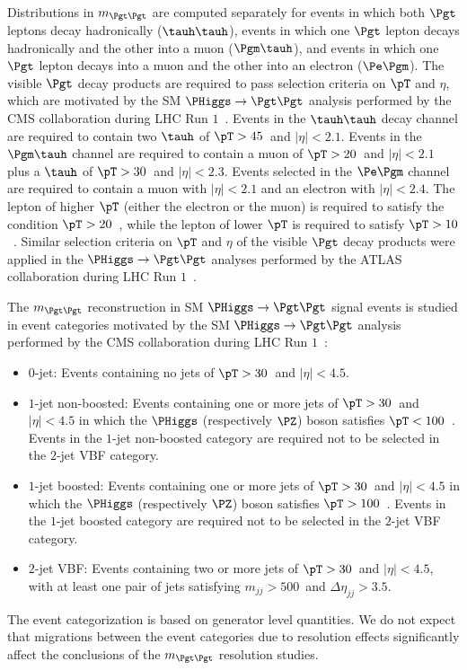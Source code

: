 Distributions in $m_{\Pgt\Pgt}$ are computed separately for events in which 
both $\Pgt$ leptons decay hadronically ($\tauh\tauh$), 
events in which one $\Pgt$ lepton decays hadronically and the other into a muon ($\Pgm\tauh$),
and events in which one $\Pgt$ lepton decays into a muon and the other into an electron ($\Pe\Pgm$).
The visible $\Pgt$ decay products are required to pass selection criteria on $\pT$ and $\eta$,
which are motivated by the SM $\PHiggs \to \Pgt\Pgt$ analysis performed by the CMS collaboration during LHC Run $1$~\cite{HIG-13-004}.
Events in the $\tauh\tauh$ decay channel are required to contain
two $\tauh$ of $\pT > 45$~\GeV and $\vert\eta\vert < 2.1$.
Events in the $\Pgm\tauh$ channel
are required to contain a muon of $\pT > 20$~\GeV and $\vert\eta\vert < 2.1$ plus a $\tauh$ of $\pT > 30$~\GeV and $\vert\eta\vert < 2.3$.
Events selected in the $\Pe\Pgm$ channel are required to contain a muon with $\vert\eta\vert < 2.1$ and an electron with $\vert\eta\vert < 2.4$.
The lepton of higher $\pT$ (either the electron or the muon) is required to satisfy the condition $\pT > 20$~\GeV,
while the lepton of lower $\pT$ is required to satisfy $\pT > 10$~\GeV.
Similar selection criteria on $\pT$ and $\eta$ of the visible $\Pgt$ decay products were applied in the $\PHiggs \to \Pgt\Pgt$
analyses performed by the ATLAS
collaboration during LHC Run $1$~\cite{ATLAS_HiggsTauTau_SM,ATLAS_HiggsTauTau_MSSM}.

The $m_{\Pgt\Pgt}$ reconstruction in SM $\PHiggs \to \Pgt\Pgt$ signal events is studied in event categories motivated by the
SM $\PHiggs \to \Pgt\Pgt$ analysis performed by the CMS collaboration during LHC Run $1$~\cite{HIG-13-004}:
\begin{itemize}
\item $0$-jet: 
  Events containing no jets of $\pT > 30$~\GeV and $\lvert \eta \rvert < 4.5$.
\item $1$-jet non-boosted:
  Events containing one or more jets of $\pT > 30$~\GeV and $\lvert \eta \rvert < 4.5$
  in which the $\PHiggs$ (respectively $\PZ$) boson satisfies $\pT < 100$~\GeV.
  Events in the $1$-jet non-boosted category are required not to be selected in the $2$-jet VBF category.
\item $1$-jet boosted:
  Events containing one or more jets of $\pT > 30$~\GeV and $\lvert \eta \rvert < 4.5$
  in which the $\PHiggs$ (respectively $\PZ$) boson satisfies $\pT > 100$~\GeV.
  Events in the $1$-jet boosted category are required not to be selected in the $2$-jet VBF category.
\item $2$-jet VBF:
  Events containing two or more jets of $\pT > 30$~\GeV and $\lvert \eta \rvert < 4.5$,
  with at least one pair of jets satisfying $m_{jj} > 500$~\GeV and $\Delta\eta_{jj} > 3.5$.
\end{itemize}
The event categorization is based on generator level quantities.
We do not expect that migrations between the event categories due to resolution effects 
significantly affect the conclusions of the $m_{\Pgt\Pgt}$ resolution studies.

